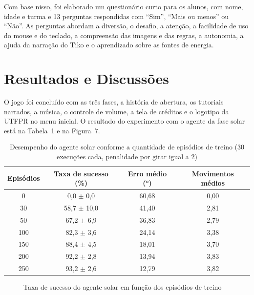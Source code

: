 \documentclass[12pt,a4paper]{article}
\newcommand{\fonte}[1]{\par\vspace{2pt}{\small Fonte: #1}}
\begin{document}
Com base nisso, foi elaborado um questionário curto para os alunos, com nome, idade e turma e 13 perguntas respondidas com ``Sim'', ``Mais ou menos'' ou ``Não''. As perguntas abordam a diversão, o desafio, a atenção, a facilidade de uso do mouse e do teclado, a compreensão das imagens e das regras, a autonomia, a ajuda da narração do Tiko e o aprendizado sobre as fontes de energia.

\section{Resultados e Discussões}

O jogo foi concluído com as três fases, a história de abertura, os tutoriais narrados, a música, o controle de volume, a tela de créditos e o logotipo da UTFPR no menu inicial. O resultado do experimento com o agente da fase solar está na Tabela~1 e na Figura~7.

\begin{table}[H]
\centering
\caption{Desempenho do agente solar conforme a quantidade de episódios de treino (30 execuções cada, penalidade por girar igual a 2)}
\begin{tabular}{cccc}
\toprule
Episódios & Taxa de sucesso (\%) & Erro médio (°) & Movimentos médios \\
\midrule
0   & 0,0 $\pm$ 0,0   & 60,68 & 0,00 \\
30  & 58,7 $\pm$ 10,0 & 41,40 & 2,81 \\
50  & 67,2 $\pm$ 6,9  & 36,83 & 2,79 \\
100 & 82,3 $\pm$ 3,6  & 24,14 & 3,38 \\
150 & 88,4 $\pm$ 4,5  & 18,01 & 3,70 \\
200 & 92,2 $\pm$ 2,8  & 13,94 & 3,83 \\
250 & 93,2 $\pm$ 2,6  & 12,79 & 3,82 \\
\bottomrule
\end{tabular}
\fonte{Autoria própria (2026)}
\end{table}

\begin{figure}[H]
\centering
\caption{Taxa de sucesso do agente solar em função dos episódios de treino}
\fonte{Autoria própria (2026)}
\end{figure}
\end{document}
